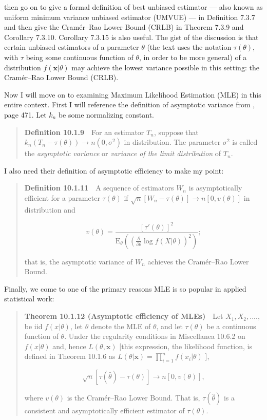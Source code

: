 \documentclass[english]{article}
\begin{document}
\cite{CasellaBerger2002} then go on to give a formal definition of
best unbiased estimator --- also known as uniform minimum variance
unbiased estimator (UMVUE) --- in Definition 7.3.7 and then give
the Cram{\'e}r--Rao Lower Bound (CRLB) in Theorem 7.3.9 and Corollary
7.3.10. Corollary 7.3.15 is also useful. The gist of the discussion
is that certain unbiased estimators of a parameter $\theta$ (the
text uses the notation $\tau(\theta)$, with $\tau$ being some continuous
function of $\theta$, in order to be more general) of a distribution
$f(\mathbf{x}|\theta)$ may achieve the lowest variance possible in
this setting: the Cram{\'e}r--Rao Lower Bound (CRLB).

Now I will move on to examining Maximum Likelihood Estimation (MLE)
in this entire context. First I will reference the definition of asymptotic
variance from \cite{CasellaBerger2002}, page 471. Let $k_{n}$ be
some normalizing constant.
\begin{quote}
\textbf{Definition 10.1.9}$\quad$For an estimator $T_{n}$, suppose
that $k_{n}(T_{n}-\tau(\theta))\rightarrow n(0,\sigma^{2})$ in distribution.
The parameter $\sigma^{2}$ is called the \textit{asymptotic variance}
or \textit{variance of the limit distribution} of $T_{n}$.
\end{quote}
I also need their definition of asymptotic efficiency to make my point:
\begin{quote}
\textbf{Definition 10.1.11}$\quad$A sequence of estimators $W_{n}$
is asymptotically efficient for a parameter $\tau(\theta)$ if $\sqrt{n}\left[W_{n}-\tau(\theta)\right]\rightarrow n\left[0,v(\theta)\right]$
in distribution and

\[
v(\theta)=\dfrac{\left[\tau'(\theta)\right]^{2}}{\mathrm{E}_{\theta}\left(\left(\frac{\partial}{\partial\theta}\log f\left(X|\theta\right)\right)^{2}\right)};
\]

that is, the asymptotic variance of $W_{n}$ achieves the Cram{\'e}r--Rao
Lower Bound.
\end{quote}
Finally, we come to one of the primary reasons MLE is so popular in
applied statistical work:
\begin{quote}
\textbf{Theorem 10.1.12 (Asymptotic efficiency of MLEs)}$\quad$Let
$X_{1},X_{2},....,$ be iid $f(x|\theta)$, let $\hat{\theta}$ denote
the MLE of $\theta$, and let $\tau(\theta)$ be a continuous function
of $\theta$. Under the regularity conditions in Miscellanea 10.6.2
on $f(x|\theta)$ and, hence $L(\theta,\mathbf{x})$ {[}this expression,
the likelihood function, is defined in Theorem 10.1.6 as $L(\theta|\mathbf{x})=\prod_{i=1}^{n}f(x_{i}|\theta)$
{]}, 

\[
\sqrt{n}\left[\tau(\hat{\theta})-\tau(\theta)\right]\rightarrow n\left[0,v(\theta)\right],
\]

where $v(\theta)$ is the Cram{\'e}r--Rao Lower Bound. That is, $\tau(\hat{\theta})$
is a consistent and asymptotically efficient estimator of $\tau(\theta)$.
\end{quote}
\end{document}
